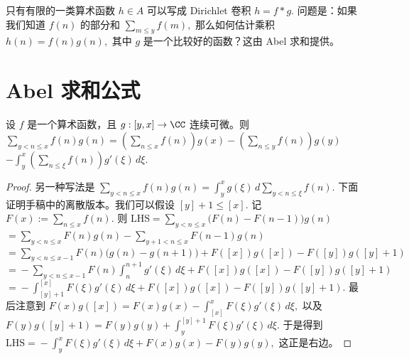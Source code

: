 
只有有限的一类算术函数 $h\in A$ 可以写成 Dirichlet 卷积
\(\textstyle h=\allowbreak{}f*g.\)
问题是：如果我们知道 $f(n)$ 的部分和
\(\textstyle \sum_{m\leq\allowbreak{} y}f(m),\allowbreak{}\)
那么如何估计乘积
\(\textstyle h(n)=\allowbreak{}f(n)g(n),\allowbreak{}\)
其中 $g$ 是一个比较好的函数？这由 Abel 求和提供。

\section{Abel 求和公式}


\begin{theorem}
	设 $f$ 是一个算术函数，且 $g:[y,x]\to\CC$ 连续可微。则
	\(\textstyle \sum_{y<n\leq\allowbreak{} x}f(n)g(n) =\allowbreak{}{} \left(\sum_{n\leq\allowbreak{} x}f(n)\right)g(x) - \left(\sum_{n\leq\allowbreak{} y}f(n)\right)g(y)\) \(\textstyle - \int_y^x \left(\sum_{n\leq\allowbreak{} \xi}f(n)\right)g'(\xi)\,d\xi.\)
\end{theorem}

\begin{proof}
	另一种写法是
	\(\textstyle \sum_{y<n\leq\allowbreak{} x}f(n)g(n) =\allowbreak{} \int_y^x g(\xi)\,d\sum_{y<n\leq\allowbreak{} \xi}f(n).\)
	下面证明手稿中的离散版本。我们可以假设
	\(\textstyle [y]+\allowbreak{}1\leq\allowbreak{} [x].\)
	记
	\(\textstyle F(x):=\allowbreak{}\sum_{n\leq\allowbreak{} x}f(n).\)
	则
	\(\textstyle \text{LHS} =\allowbreak{} \sum_{y<n\leq\allowbreak{} x}\bigl(F(n)-F(n-1)\bigr)g(n)\) \(\textstyle =\allowbreak{} \sum_{y<n\leq\allowbreak{} x}F(n)g(n) - \sum_{y+\allowbreak{}1<n\leq\allowbreak{} x}F(n-1)g(n)\) \(\textstyle =\allowbreak{} \sum_{y<n\leq\allowbreak{} x-1}F(n)\bigl(g(n)-g(n+\allowbreak{}1)\bigr) +\allowbreak{} F([x])g([x])-F([y])g([y]+\allowbreak{}1)\) \(\textstyle =\allowbreak{} -\sum_{y<n\leq\allowbreak{} x-1}F(n)\int_n^{n+\allowbreak{}1}g'(\xi)\,d\xi +\allowbreak{} F([x])g([x])-F([y])g([y]+\allowbreak{}1)\) \(\textstyle =\allowbreak{} -\int_{[y]+\allowbreak{}1}^{[x]}F(\xi)g'(\xi)\,d\xi +\allowbreak{} F([x])g([x])-F([y])g([y]+\allowbreak{}1).\)
	最后注意到
	\(\textstyle F(x)g([x]) =\allowbreak{} F(x)g(x)-\int_{[x]}^xF(\xi)g'(\xi)\,d\xi,\allowbreak{}\)
	以及
	\(\textstyle F(y)g([y]+\allowbreak{}1) =\allowbreak{} F(y)g(y)+\allowbreak{}\int_y^{[y]+\allowbreak{}1}F(\xi)g'(\xi)\,d\xi.\)
	于是得到
	\(\textstyle \text{LHS} =\allowbreak{} -\int_y^x F(\xi)g'(\xi)\,d\xi+\allowbreak{}F(x)g(x)-F(y)g(y),\allowbreak{}\)
	这正是右边。
\end{proof}

